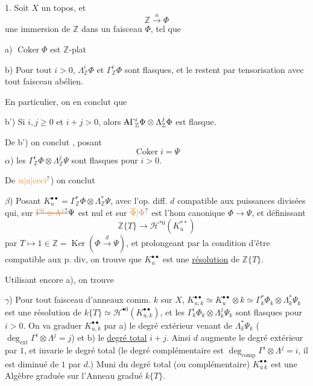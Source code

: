 1. Soit $X$ un topos, et
\[
\mathbb{Z}\xrightarrow{u}\Phi
\]
une immersion de $\mathbb{Z}$ dans un faisceau $\Phi$, tel que

a) $\operatorname{Coker}\Phi$ est $\mathbb{Z}$-plat

b) Pour tout $i>0$, $\Lambda_{\mathbb{Z}}^i\Phi$ et $\Gamma_{\mathbb{Z}}^i\Phi$ sont flasques, et le restent par tensorisation avec tout faisceau abélien.

En particulier, on en conclut  que 

b') Si $i,j\geq 0$ et $i+j>0$, alors $\deleted{\Lambda}\Gamma_{\mathbb{Z}}^i\Phi\otimes\Lambda_{\mathbb{Z}}^j\Phi$ est flasque.

De b') on conclut , posant
\[
\operatorname{Coker}i=\Psi
\]
 $\alpha$) les $\Gamma_{\mathbb{Z}}^i\Phi\otimes\Lambda_{\mathbb{Z}}^j\Psi$ sont flasques pour $i>0$. 

De $\unsure{\alpha|a|\text{ceci}}$) on conclut\unsure{:}

$\beta$) Posant $K_u^{\bullet\bullet}=\Gamma_{\mathbb{Z}}^*\Phi\otimes\Lambda_{\mathbb{Z}}^*\Psi$, avec l'op. diff. \deleted{\unsure{$\delta$}} $d$ compatible aux puissances divisées qui, sur $\deleted{\unsure{\Gamma^0\otimes\Lambda^j}}\Psi$ est nul et sur $\unsure{\overline{\Phi}|\Phi}$ est l'hom canonique $\Phi\longrightarrow\Psi$, et définissant
\[
\mathbb{Z}\{T\}\longrightarrow\mathscr{H}^{*0}(K_u^{**})
\]
par $T\longmapsto 1\in\mathbb{Z}=\operatorname{Ker}(\Phi\xrightarrow{d}\Psi)$, et prolongeant par la condition d'être compatible aux p. div, on trouve que $K_u^{\bullet\bullet}$ est une \uline{résolution} de $\mathbb{Z}\{T\}$.

Utilisant encore a),  on trouve

$\gamma$) Pour tout faisceau d'anneaux comm. $k$ sur $X$, $K_{u,k}^{\bullet\bullet}\simeq K_u^{\bullet\bullet}\otimes k\simeq\Gamma_k^*\Phi_k\otimes\Lambda_k^*\Psi_k$ est une résolution de $k\{T\}\simeq\mathscr{H}^{\bullet 0}(K_{u,k}^{\bullet\bullet})$, et les $\Gamma_k^i\Phi_k\otimes\Lambda_k^j\Psi_k$ sont flasques pour $i>0$.
On va graduer $K_{u,k}^{\bullet\bullet}$ par a) le degré extérieur venant de $\Lambda_k^*\Psi_k$ ($\deg_{\mathrm{ext}}\Gamma^i\otimes\Lambda^j=j$) et b) le \uline{degré total} $i+j$. Ainsi $d$ augmente le degré extérieur par $1$, et invarie le degré total  (le degré complémentaire est $\deg_{\mathrm{comp}}\Gamma^i\otimes\Lambda^j=i$, il est diminué de $1$ par $d$.) Muni du degré total (ou complémentaire) $K_{u\,k}^{\bullet\bullet}$ est une Algèbre graduée sur l'Anneau gradué $k\{T\}$.

